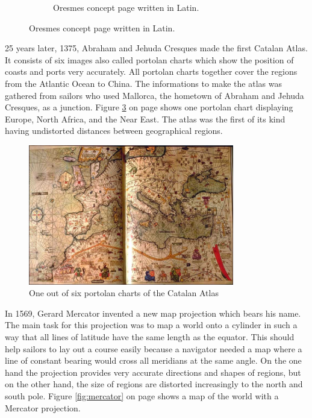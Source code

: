 \begin{figure}[!htb]
\begin{subfigure}[b]{0.4\textwidth}
    \caption{Oresmes concept page written in Latin.}
    \label{fig:oresme-page}
  \end{subfigure}
  \caption[
    Oresmes concept page written in Latin, Urldate: 07.2016 \newline
    \small\texttt{\url{http://datavis.ca/milestones//admin/uploads/images/icons/oresmekl.gif}} \newline
    \small\texttt{\url{http://datavis.ca/milestones//admin/uploads/images/oresme6.gif}}
  ]{
    Oresmes concept page written in Latin.
  }
\end{figure}
\cbend

25 years later, 1375, Abraham and Jehuda Cresques made the first Catalan Atlas. It consists of six images also called portolan charts which show the position of coasts and ports very accurately. All portolan charts together cover the regions from the Atlantic Ocean to China. The informations to make the atlas was gathered from sailors who used Mallorca, the hometown of Abraham and Jehuda Cresques, as a junction. Figure \ref{fig:catalan-atlas} on page \pageref{fig:catalan-atlas} shows one portolan chart displaying Europe, North Africa, and the Near East. The atlas was the first of its kind having undistorted distances between geographical regions.

\begin{figure}[!htb]
\centering
\includegraphics[width=0.8\textwidth,keepaspectratio]{images/history/catalan-atlas.jpg}
\caption[
    One out of six portolan charts of the Catalan Atlas, Urldate: 07.2016 \newline
\small\texttt{\url{http://datavis.ca/milestones//admin/uploads/images/CatalanE.jpg}}
]{One out of six portolan charts of the Catalan Atlas}
\label{fig:catalan-atlas}
\end{figure}

In 1569, Gerard Mercator invented a new map projection which bears his name. The main task for this projection was to map a world onto a cylinder in such a way that all lines of latitude have the same length as the equator. This should help sailors to lay out a course easily because a navigator needed a map where a line of constant bearing would cross all meridians at the same angle. On the one hand the projection provides very accurate directions and shapes of regions, but on the other hand, the size of regions are distorted increasingly to the north and south pole. Figure \ref{fig:mercator} on page \pageref{fig:mercator} shows a map of the world with a Mercator projection.

